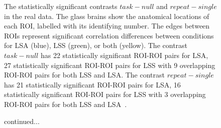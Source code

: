 \documentclass[10pt,letterpaper]{article}
\begin{document}
\vspace*{0.2in}

\begin{flushleft}
{\Large
\textbf{} %
}
\newline
\end{flushleft}

\linenumbers
\begin{figure}[H]
    \centering



    \caption{
     The statistically significant contrasts $task - null$ and $repeat - single$
     in the real data.
     The glass brains show the anatomical locations of each ROI,
     labelled with its identifying number.
     The edges between ROIs represent significant correlation differences
     between conditions for LSA (blue), LSS (green), or both (yellow).
     The contrast $task - null$ has 22 statistically significant ROI-ROI
     pairs for LSA, 27 statistically significant ROI-ROI pairs
     for LSS with 9 overlapping ROI-ROI pairs for both LSS and LSA.
     The contrast $repeat - single$ has 21 statistically significant ROI-ROI
     pairs for LSA, 16 statistically significant ROI-ROI pairs
     for LSS with 3 overlapping ROI-ROI pairs for both LSS and LSA~\cite{Abdulrahman2016}.
    }
    \label{fig:significant-contrasts}
  \end{figure}

\begin{figure}[H]
    \ContinuedFloat
    \centering



    \caption{
        continued...
    }
    \label{fig:significant-contrasts}
\end{figure}
\end{document}
